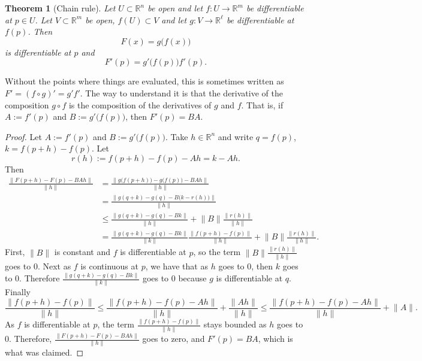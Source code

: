\documentclass[12pt]{book}
\newcommand{\snorm}[1]{\lVert {#1} \rVert}
\newcommand{\R}{{\mathbb{R}}}
\theoremstyle{plain}
\newtheorem{thm}{Theorem}[section]
\theoremstyle{remark}
\theoremstyle{definition}
\theoremstyle{exercise}
\theoremstyle{example}
\begin{document}
\begin{thm}[Chain rule]
Let $U \subset \R^n$ be open and let $f \colon U \to \R^m$ be
differentiable at $p \in U$.  Let $V \subset \R^m$ be open,
$f(U) \subset V$ and let $g \colon V \to \R^\ell$ be differentiable
at $f(p)$.  Then
\begin{equation*}
F(x) = g\bigl(f(x)\bigr)
\end{equation*}
is differentiable at $p$ and
\begin{equation*}
F'(p) = g'\bigl(f(p)\bigr) f'(p) .
\end{equation*}
\end{thm}

Without the points where things are evaluated, this is sometimes written as
$F' = {(f \circ g)}' = g' f'$.  The way to
understand it is that the derivative of the composition $g \circ f$
is the composition of the derivatives of $g$ and $f$.  That is, if $A :=
f'(p)$ and $B := g'\bigl(f(p)\bigr)$, then $F'(p) = BA$.

\begin{proof}
Let $A := f'(p)$ and $B := g'\bigl(f(p)\bigr)$.  Take $h \in \R^n$
and write $q = f(p)$, $k = f(p+h)-f(p)$.  Let
\begin{equation*}
r(h) := f(p+h)-f(p) - A h = k - Ah.
\end{equation*}
Then
\begin{equation*}
\begin{split}
\frac{\snorm{F(p+h)-F(p) - BAh}}{\snorm{h}}
& =
\frac{\snorm{g\bigl(f(p+h)\bigr)-g\bigl(f(p)\bigr) - BAh}}{\snorm{h}}
\\
& =
\frac{\snorm{g(q+k)-g(q) - B\bigl(k-r(h)\bigr)}}{\snorm{h}}
\\
& \leq
\frac
{\snorm{g(q+k)-g(q) - Bk}}
{\snorm{h}}
+
\snorm{B}
\frac
{\snorm{r(h)}}
{\snorm{h}}
\\
& =
\frac
{\snorm{g(q+k)-g(q) - Bk}}
{\snorm{k}}
\frac
{\snorm{f(p+h)-f(p)}}
{\snorm{h}}
+
\snorm{B}
\frac
{\snorm{r(h)}}
{\snorm{h}} .
\end{split}
\end{equation*}
First, $\snorm{B}$ is constant and $f$ is differentiable at $p$,
so
the term $\snorm{B}\frac{\snorm{r(h)}}{\snorm{h}}$ goes to 0.
Next as $f$ is continuous at $p$, we have that as 
$h$ goes to 0, then $k$ goes to 0.  Therefore
$\frac
{\snorm{g(q+k)-g(q) - Bk}}
{\snorm{k}}$ goes to 0 because $g$ is differentiable at $q$.
Finally 
\begin{equation*}
\frac
{\snorm{f(p+h)-f(p)}}
{\snorm{h}}
\leq
\frac
{\snorm{f(p+h)-f(p)-Ah}}
{\snorm{h}}
+
\frac
{\snorm{Ah}}
{\snorm{h}}
\leq
\frac
{\snorm{f(p+h)-f(p)-Ah}}
{\snorm{h}}
+
\snorm{A} .
\end{equation*}
As $f$ is differentiable at $p$,
the term
$
\frac
{\snorm{f(p+h)-f(p)}}
{\snorm{h}}
$
stays bounded as $h$ goes to 0.  Therefore, 
$\frac{\snorm{F(p+h)-F(p) - BAh}}{\snorm{h}}$ goes to zero, and
$F'(p) = BA$, which is what was claimed.
\end{proof}
\end{document}
